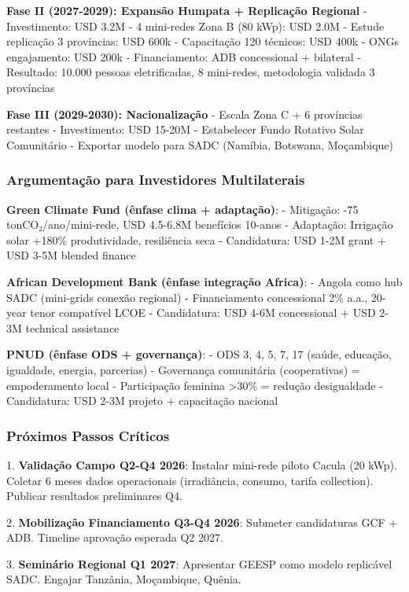 \documentclass[12pt, a4paper]{article}
\begin{document}
{{{{{{{{{{{{\textbf{Fase II (2027-2029): Expansão Humpata + Replicação Regional}
- Investimento: USD 3.2M
  - 4 mini-redes Zona B (80 kWp): USD 2.0M
  - Estude replicação 3 províncias: USD 600k
  - Capacitação 120 técnicos: USD 400k
  - ONGs engajamento: USD 200k
- Financiamento: ADB concessional + bilateral
- Resultado: 10.000 pessoas eletrificadas, 8 mini-redes, metodologia validada 3 províncias

\textbf{Fase III (2029-2030): Nacionalização}
- Escala Zona C + 6 províncias restantes
- Investimento: USD 15-20M
- Estabelecer Fundo Rotativo Solar Comunitário
- Exportar modelo para SADC (Namíbia, Botswana, Moçambique)

\subsubsection{Argumentação para Investidores Multilaterais}

\textbf{Green Climate Fund (ênfase clima + adaptação)}:
- Mitigação: -75 tonCO₂/ano/mini-rede, USD 4.5-6.8M benefícios 10-anos
- Adaptação: Irrigação solar +180\% produtividade, resiliência seca
- Candidatura: USD 1-2M grant + USD 3-5M blended finance

\textbf{African Development Bank (ênfase integração Africa)}:
- Angola como hub SADC (mini-grids conexão regional)
- Financiamento concessional 2\% a.a., 20-year tenor compatível LCOE
- Candidatura: USD 4-6M concessional + USD 2-3M technical assistance

\textbf{PNUD (ênfase ODS + governança)}:
- ODS 3, 4, 5, 7, 17 (saúde, educação, igualdade, energia, parcerias)
- Governança comunitária (cooperativas) = empoderamento local
- Participação feminina >30\% = redução desigualdade
- Candidatura: USD 2-3M projeto + capacitação nacional

\subsubsection{Próximos Passos Críticos}

1. \textbf{Validação Campo Q2-Q4 2026}: Instalar mini-rede piloto Cacula (20 kWp). Coletar 6 meses dados operacionais (irradiância, consumo, tarifa collection). Publicar resultados preliminares Q4.

2. \textbf{Mobilização Financiamento Q3-Q4 2026}: Submeter candidaturas GCF + ADB. Timeline aprovação esperada Q2 2027.

3. \textbf{Seminário Regional Q1 2027}: Apresentar GEESP como modelo replicável SADC. Engajar Tanzânia, Moçambique, Quênia.

}}}}}}}}}}}}
\end{document}

